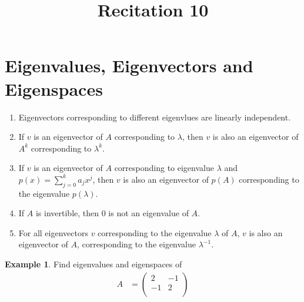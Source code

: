 \documentclass[fleqn, a4paper, 12pt]{article}
\title{Recitation 10}
\author{}
\date{\formatdate{31}{12}{2014}}
\theoremstyle{definition}
\newtheorem{example}{Example}
\theoremstyle{theorem}
\begin{document}
\maketitle

\tableofcontents

\newpage
\section{Eigenvalues, Eigenvectors and Eigenspaces}

\begin{enumerate}
	\item Eigenvectors corresponding to different eigenvlues are linearly independent.
	\item If $v$ is an eigenvector of $A$ corresponding to $\lambda$, then $v$ is also an eigenvector of $A^k$ corresponding to $\lambda^k$.
	\item If $v$ is an eigenvector of $A$ corresponding to eigenvalue $\lambda$ and $p(x) = \sum_{j = 0}^{k} a_j x^j$, then $v$ is also an eigenvector of $p(A)$ corresponding to the eigenvalue $p(\lambda)$.
	\item If $A$ is invertible, then 0 is not an eigenvalue of $A$.
	\item For all eigenvectors $v$ corresponding to the eigenvalue $\lambda$ of $A$, $v$ is also an eigenvector of $A$, corresponding to the eigenvalue $\lambda^{-1}$.
\end{enumerate}

\begin{example}
	Find eigenvalues and eigenspaces of 
	\begin{align*}
		A &=
			\begin{pmatrix}
				2 & -1\\
				-1 & 2\\
			\end{pmatrix}
	\end{align*}
\end{example}
\end{document}
